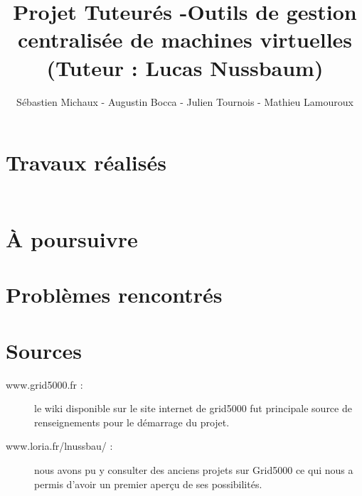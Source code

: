 \documentclass{report}
\begin{document}
\title{Projet Tuteurés -Outils de gestion centralisée de machines virtuelles (Tuteur : Lucas Nussbaum) }
\author{Sébastien Michaux - Augustin Bocca - Julien Tournois - Mathieu Lamouroux}
\date{}
\maketitle
\chapter{Travaux réalisés}
\section{}

\begin{verbatim}

\end{verbatim}

\section{}
\subsection{}

\chapter{À poursuivre}

\chapter{Problèmes rencontrés}

\appendix
\chapter{Sources}
\begin{description}
\item[www.grid5000.fr : ]le wiki disponible sur le site internet de grid5000 fut principale source de renseignements pour le démarrage du projet.
\item[www.loria.fr/lnussbau/ : ]nous avons pu y consulter des anciens projets sur Grid5000 ce qui nous a permis d'avoir un premier aperçu de ses possibilités.
\end{description}
\end{document}

